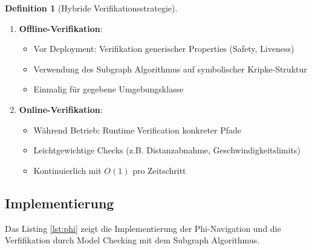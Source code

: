 ﻿\documentclass[a4paper,12pt]{article}
\theoremstyle{definition}
\newtheorem{definition}{Definition}[section]
\begin{document}
\begin{definition}[Hybride Verifikationsstrategie]
\begin{enumerate}
	\item \textbf{Offline-Verifikation}: 
	\begin{itemize}
		\item Vor Deployment: Verifikation generischer Properties (Safety, Liveness)
		\item Verwendung des Subgraph Algorithmus auf symbolischer Kripke-Struktur
		\item Einmalig für gegebene Umgebungsklasse
	\end{itemize}
	
	\item \textbf{Online-Verifikation}:
	\begin{itemize}
		\item Während Betrieb: Runtime Verification konkreter Pfade
		\item Leichtgewichtige Checks (z.B. Distanzabnahme, Geschwindigkeitslimits)
		\item Kontinuierlich mit $O(1)$ pro Zeitschritt
	\end{itemize}
\end{enumerate}
\end{definition}

\subsection{Implementierung}

Das Listing \ref{lst:phi} zeigt die Implementierung der Phi-Navigation und die Verfifikation durch Model Checking mit dem Subgraph Algorithmus.
\end{document}
